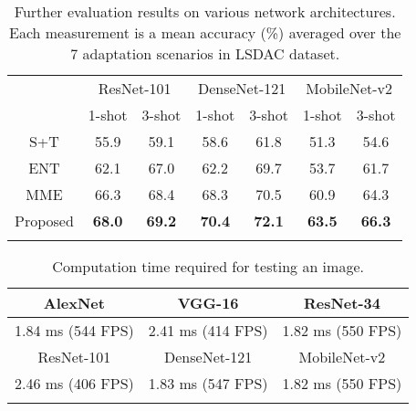 \documentclass[a4paper,conference]{IEEEtran}
\begin{document}
\begin{table}[!t]
\centering
\caption{Further evaluation results on various network architectures. Each measurement is a mean accuracy (\%) averaged over the 7 adaptation scenarios in LSDAC dataset.}
\begin{tabular}{c|c@{\;\;}cc@{\;\;}cc@{\;\;}c}
\Xhline{4\arrayrulewidth}
\multirow{2}{*}{Method} & \multicolumn{2}{c}{ResNet-101} & \multicolumn{2}{c}{DenseNet-121} & \multicolumn{2}{c}{MobileNet-v2}\\
& 1-shot & 3-shot & 1-shot & 3-shot & 1-shot & 3-shot\\
\hline
S+T & 55.9 & 59.1 & 58.6 & 61.8 & 51.3 & 54.6\\
ENT & 62.1 & 67.0 & 62.2 & 69.7 & 53.7 & 61.7\\
MME & 66.3 & 68.4 & 68.3 & 70.5 & 60.9 & 64.3\\
Proposed & \textbf{68.0} & \textbf{69.2} & \textbf{70.4} & \textbf{72.1} & \textbf{63.5} & \textbf{66.3}\\
\Xhline{4\arrayrulewidth}
\end{tabular}
\label{tab:backbone}
\end{table}



\begin{table}[!t]
\centering
\caption{Computation time required for testing an image.}
\begin{tabular}{c|c|c}
\Xhline{4\arrayrulewidth}
AlexNet & VGG-16 & ResNet-34\\
\hline
1.84 ms (544 FPS) & 2.41 ms (414 FPS) & 1.82 ms (550 FPS)\\
\hline
\hline
ResNet-101 & DenseNet-121 & MobileNet-v2\\
\hline
2.46 ms (406 FPS) & 1.83 ms (547 FPS) & 1.82 ms (550 FPS)\\
\Xhline{4\arrayrulewidth}
\end{tabular}
\label{tab:time}
\end{table}
\end{document}
